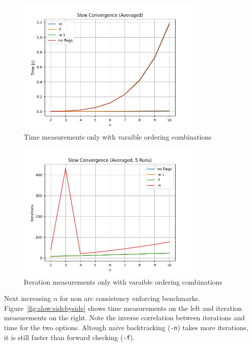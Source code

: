 \begin{figure}[ht]
	\centering
	\includegraphics[width=0.8\textwidth]{./Problems/slow_convergence/plots/time_small.png}
	\caption{Time measurements only with varaible ordering combinations}
	\label{fig:slow:time_small}
\end{figure}

\begin{figure}[ht]
	\centering
	\includegraphics[width=0.8\textwidth]{./Problems/slow_convergence/plots/iterations_small.png}
	\caption{Iteration measurements only with varaible ordering combinations}
	\label{fig:slow:iterations_small}
\end{figure}

Next increasing $n$ for non arc consistency enforcing benchmarks. Figure~\ref{fig:slow:sidebyside} shows time measurements on the left and iteration measurements on the right. Note the inverse correlation between iterations and time for the two options. Altough naive backtracking (\verb|-n|) takes more iterations, it is still faster than forward checking (\verb|-f|).

